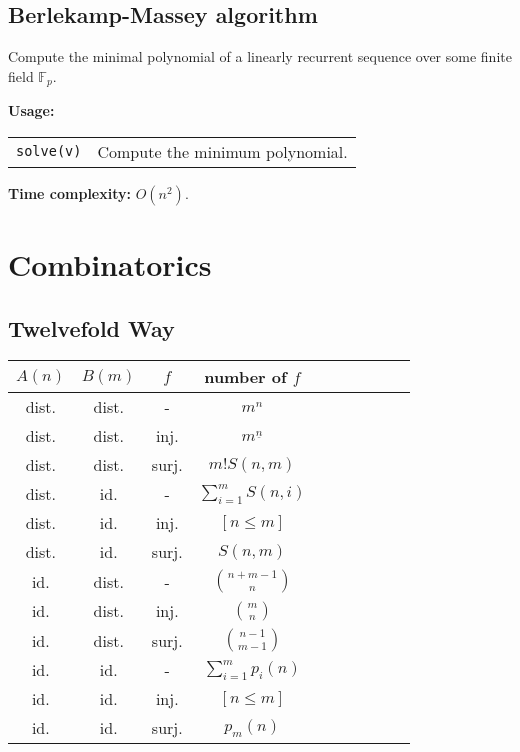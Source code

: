 \subsection{Berlekamp-Massey algorithm}
Compute the minimal polynomial of a linearly recurrent sequence over some finite field $\mathbb{F}_p$. \par
\textbf{Usage:} \\[0.1cm]
\begin{tabular}{p{2cm} p{9.5cm}}
  \lstinline|solve(v)| & Compute the minimum polynomial. \\
\end{tabular} \par
\textbf{Time complexity:} $O(n^2)$. \par

\clearpage

\section{Combinatorics}
\subsection{Twelvefold Way}
\begin{table}[htbp]
  \centering
  \begin{tabular}{|c|c|c|c|c|c|c|c|c|c|}
  \hline
  $A (n)$ & $B (m)$ & $f$ & number of $f$ \\ \hline
  dist. & dist. & - & $m^n$ \\ \hline
  dist. & dist. & inj. & $m^{\underline{n}}$ \\ \hline
  dist. & dist. & surj. & $m! S(n, m)$ \\ \hline
  dist. & id. & - & $\sum_{i=1}^m S(n, i)$ \\ \hline
  dist. & id. & inj. & $[n \leq m]$ \\ \hline
  dist. & id. & surj. & $S(n, m)$ \\ \hline
  id. & dist. & - & $\binom{n+m-1}{n}$ \\ \hline
  id. & dist. & inj. & $\binom{m}{n}$ \\ \hline
  id. & dist. & surj. & $\binom{n-1}{m-1}$ \\ \hline
  id. & id. & - & $\sum_{i=1}^m p_i(n)$ \\ \hline
  id. & id. & inj. & $[n \leq m]$ \\ \hline
  id. & id. & surj. & $p_m(n)$ \\ \hline
  \end{tabular}
\end{table}

